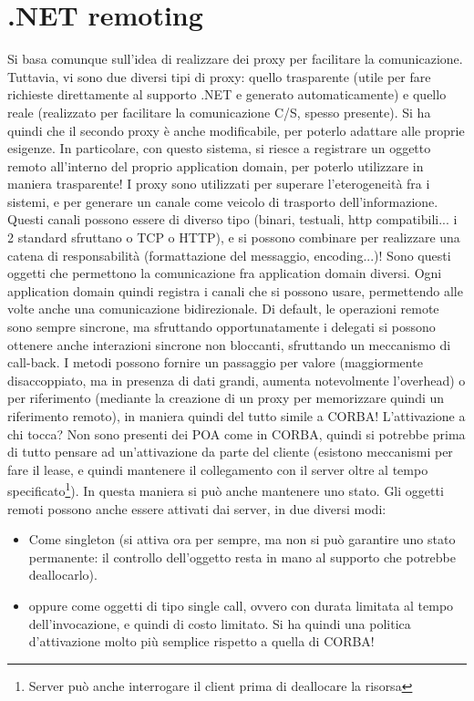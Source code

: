 \section{.NET remoting}
Si basa comunque sull'idea di realizzare dei proxy per facilitare la comunicazione.
Tuttavia, vi sono due diversi tipi di proxy: quello trasparente (utile per fare richieste direttamente al supporto .NET
e generato automaticamente) e quello reale (realizzato per facilitare la comunicazione C/S, spesso presente). Si ha
quindi che il secondo proxy è anche modificabile, per poterlo adattare alle proprie esigenze. In particolare, con
questo sistema, si riesce a registrare un oggetto remoto all'interno del proprio application domain, per poterlo
utilizzare in maniera trasparente!
I proxy sono utilizzati per superare l'eterogeneità fra i sistemi, e per generare un canale come veicolo di trasporto
dell'informazione. Questi canali possono essere di diverso tipo (binari, testuali, http compatibili... i 2 standard
sfruttano o TCP o HTTP), e si possono combinare per realizzare una catena di responsabilità (formattazione del
messaggio, encoding...)! Sono questi oggetti che permettono la comunicazione fra application domain diversi. Ogni
application domain quindi registra i canali che si possono usare, permettendo alle volte anche una comunicazione
bidirezionale.
Di default, le operazioni remote sono sempre sincrone, ma sfruttando opportunatamente i delegati si possono ottenere
anche interazioni sincrone non bloccanti, sfruttando un meccanismo di call-back. I metodi possono fornire un
passaggio per valore (maggiormente disaccoppiato, ma in presenza di dati grandi, aumenta notevolmente l'overhead) o per
riferimento (mediante la creazione di un proxy per memorizzare quindi un riferimento remoto), in maniera quindi del
tutto simile a CORBA!
L'attivazione a chi tocca? Non sono presenti dei POA come in CORBA, quindi si potrebbe prima di tutto pensare ad
un'attivazione da parte del cliente (esistono meccanismi per fare il lease, e quindi mantenere il collegamento con il
server oltre al tempo specificato\footnote{Server può anche interrogare il client prima di deallocare la risorsa}). In
questa maniera si può anche mantenere uno stato.
Gli oggetti remoti possono anche essere attivati dai server, in due diversi modi:
\begin{itemize}
 \item Come singleton (si attiva ora per sempre, ma non si può garantire uno stato permanente: il controllo dell'oggetto
 resta in mano al supporto che potrebbe deallocarlo).
 \item oppure come oggetti di tipo single call, ovvero con durata limitata al tempo dell'invocazione, e quindi di costo
 limitato. Si ha quindi una politica d'attivazione molto più semplice rispetto a quella di CORBA!
\end{itemize}